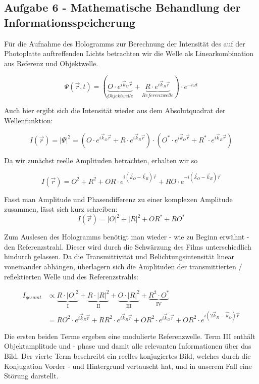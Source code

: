 \subsection*{Aufgabe 6 - Mathematische Behandlung der Informationsspeicherung}
Für die Aufnahme des Hologramms zur Berechnung der Intensität des auf der Photoplatte auftreffenden Lichts betrachten wir die Welle als Linearkombination aus Referenz und Objektwelle.

\begin{equation}
	\Psi(\vec{r},t) = (\underbrace{O\cdot e^{i\vec{k}_O\vec{r}}}_{Objektwelle} + \underbrace{R\cdot e^{i\vec{k}_R\vec{r}}}_{Referenzwelle})\cdot e^{-i\omega t}
\end{equation}

Auch hier ergibt sich die Intensität wieder aus dem Absolutquadrat der Wellenfunktion:

\begin{equation}
	I(\vec{r}) = \left| \Psi \right|^2 = (O\cdot e^{i\vec{k}_O\vec{r}} + R\cdot e^{i\vec{k}_R\vec{r}})\cdot (O^*\cdot e^{i\vec{k}_O\vec{r}} + R^*\cdot e^{i\vec{k}_R\vec{r}})
\end{equation}

Da wir zunächst reelle Amplituden betrachten, erhalten wir so

\begin{equation}
	I(\vec{r}) = O^2 + R^2 + OR\cdot e^{i(\vec{k}_O -\vec{k}_R)\vec{r}} + RO \cdot e^{-i(\vec{k}_O -\vec{k}_R)\vec{r}}
\end{equation}

Fasst man Amplitude und Phasendifferenz zu einer komplexen Amplitude zusammen, lässt sich kurz schreiben:
\begin{equation}
	I(\vec{r}) = \left| O \right|^2 + \left| R \right|^2 + OR^* + RO^*
\end{equation}

Zum Auslesen des Hologramms benötigt man wieder - wie zu Beginn erwähnt - den Referenzstrahl. Dieser wird durch die Schwärzung des Films unterschiedlich hindurch gelassen. Da die Transmittivität und Belichtungsintensität linear voneinander abhängen,  überlagern sich die Amplituden der transmittierten / reflektierten Welle und des Referenzstrahls:

\begin{align}
	I_{gesamt} &\propto \underbrace{R \cdot \left| O \right|^2}_{\text{I}} + \underbrace{R \cdot \left| R \right|^2}_{\text{II}} + \underbrace{O \cdot \left| R \right|^2}_{\text{III}} + \underbrace{R^2 \cdot O^*}_{\text{IV}}\\
	&= RO^2\cdot e^{i\vec{k}_R\vec{r}} + RR^2\cdot e^{i\vec{k}_R\vec{r}} + OR^2\cdot e^{i\vec{k}_O\vec{r}} + OR^2\cdot e^{i(2\vec{k}_R - \vec{k}_O)\vec{r}}
\end{align}

Die ersten beiden Terme ergeben eine modulierte Referenzwelle. Term III enthält Objektamplitude und - phase und damit alle relevanten Informationen über das Bild. Der vierte Term beschreibt ein reelles konjugiertes Bild, welches durch die Konjugation Vorder - und Hintergrund vertauscht hat, und in unserem Fall eine Störung darstellt.

